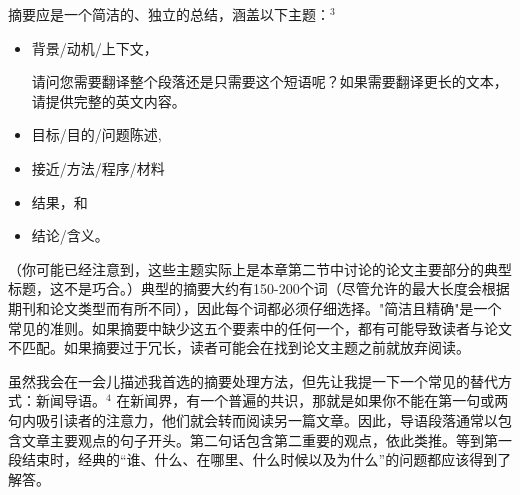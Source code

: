 摘要应是一个简洁的、独立的总结，涵盖以下主题：${ }^{3}$

\begin{itemize}
\item 背景/动机/上下文，


请问您需要翻译整个段落还是只需要这个短语呢？如果需要翻译更长的文本，请提供完整的英文内容。
\item 目标/目的/问题陈述,
\item 接近/方法/程序/材料
\item 结果，和
\item 结论/含义。
\end{itemize}

（你可能已经注意到，这些主题实际上是本章第二节中讨论的论文主要部分的典型标题，这不是巧合。）典型的摘要大约有150-200个词（尽管允许的最大长度会根据期刊和论文类型而有所不同），因此每个词都必须仔细选择。"简洁且精确"是一个常见的准则。如果摘要中缺少这五个要素中的任何一个，都有可能导致读者与论文不匹配。如果摘要过于冗长，读者可能会在找到论文主题之前就放弃阅读。

虽然我会在一会儿描述我首选的摘要处理方法，但先让我提一下一个常见的替代方式：新闻导语。${ }^{4}$ 在新闻界，有一个普遍的共识，那就是如果你不能在第一句或两句内吸引读者的注意力，他们就会转而阅读另一篇文章。因此，导语段落通常以包含文章主要观点的句子开头。第二句话包含第二重要的观点，依此类推。等到第一段结束时，经典的“谁、什么、在哪里、什么时候以及为什么”的问题都应该得到了解答。

